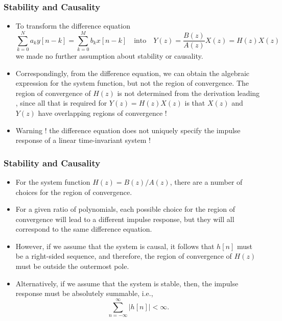 \begin{frame}
\frametitle{Stability and Causality}
\begin{itemize}
\item To transform the difference equation
$$
 \sum_{k=0}^{N}a_{k}y[n-k]=\sum_{k=0}^{M}b_{k}x[n-k] \quad \text{into} \quad Y(z)= \frac{B(z)}{A(z)} X(z) = H(z) X(z)
$$
we made no further assumption about stability or causality.
\item Correspondingly, from the difference equation, we can obtain the algebraic expression for the system function, but not the region of convergence. The region of convergence of $H(z)$ is \alert{not determined} from the derivation leading , since all that is required for $Y(z)= H(z) X(z)$ is that $X(z)$ and $Y(z)$ have overlapping regions of convergence !
\item \alert{Warning !}  \alert{the difference equation does not uniquely specify the impulse response of a linear time-invariant system} !
\end{itemize}
\end{frame}


\begin{frame}
\frametitle{Stability and Causality}
\begin{itemize}
\item For the system function $H(z)= B(z)/A(z)$, there are a number of choices for the region of convergence.
\item For a given ratio of polynomials, \alert{each possible choice for the region of convergence will lead to a different impulse response}, but they will all \alert{correspond to the same difference equation}.
\item However, \alert{if we assume that the system is causal}, it follows that $h[n]$ must be a right-sided sequence, and therefore, the region of convergence of $H(z)$ must be outside the outermost pole.
\item Alternatively, if we assume that \alert{the system is stable}, then,  the impulse response must be absolutely summable, i.e.,
$$
\sum_{n=-\infty}^{\infty}|h[n]|<\infty.
$$
\end{itemize}
\end{frame}

